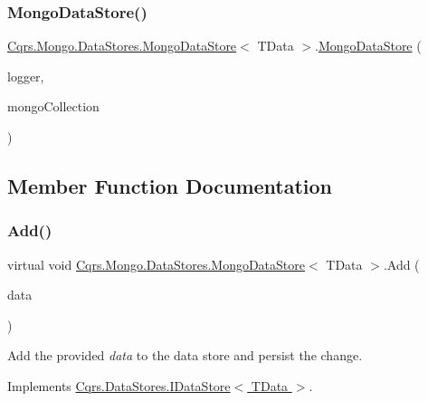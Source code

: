 \subsubsection{\texorpdfstring{Mongo\+Data\+Store()}{MongoDataStore()}}
{\footnotesize\ttfamily \hyperlink{classCqrs_1_1Mongo_1_1DataStores_1_1MongoDataStore}{Cqrs.\+Mongo.\+Data\+Stores.\+Mongo\+Data\+Store}$<$ T\+Data $>$.\hyperlink{classCqrs_1_1Mongo_1_1DataStores_1_1MongoDataStore}{Mongo\+Data\+Store} (\begin{DoxyParamCaption}\item[{I\+Logger}]{logger,  }\item[{\hyperlink{classCqrs_1_1Mongo_1_1DataStores_1_1MongoDataStore_aa183a8ce44ec16d755f1e4fbe5ec4b10}{Mongo\+Collection}$<$ T\+Data $>$}]{mongo\+Collection }\end{DoxyParamCaption})}



\subsection{Member Function Documentation}
\mbox{\label{classCqrs_1_1Mongo_1_1DataStores_1_1MongoDataStore_a27bcfb40fe8203e09d320b2aa19fff3a}} 
\subsubsection{\texorpdfstring{Add()}{Add()}\hspace{0.1cm}{\footnotesize\ttfamily [1/2]}}
{\footnotesize\ttfamily virtual void \hyperlink{classCqrs_1_1Mongo_1_1DataStores_1_1MongoDataStore}{Cqrs.\+Mongo.\+Data\+Stores.\+Mongo\+Data\+Store}$<$ T\+Data $>$.Add (\begin{DoxyParamCaption}\item[{T\+Data}]{data }\end{DoxyParamCaption})\hspace{0.3cm}{\ttfamily [virtual]}}



Add the provided {\itshape data}  to the data store and persist the change. 



Implements \hyperlink{interfaceCqrs_1_1DataStores_1_1IDataStore_a114404daaf37fec9cc5547cd9a17858c}{Cqrs.\+Data\+Stores.\+I\+Data\+Store$<$ T\+Data $>$}.

